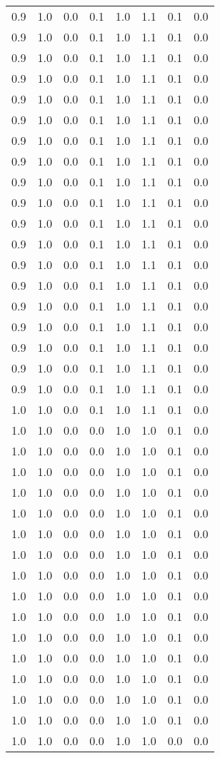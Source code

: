 \begin{tabular}{L{1in}|L{1in}|L{1in}|L{1in}|L{1in}|L{1in}|L{1in}|L{1in}}
0.9&1.0&0.0&0.1&1.0&1.1&0.1&0.0\\
0.9&1.0&0.0&0.1&1.0&1.1&0.1&0.0\\
0.9&1.0&0.0&0.1&1.0&1.1&0.1&0.0\\
0.9&1.0&0.0&0.1&1.0&1.1&0.1&0.0\\
0.9&1.0&0.0&0.1&1.0&1.1&0.1&0.0\\
0.9&1.0&0.0&0.1&1.0&1.1&0.1&0.0\\
0.9&1.0&0.0&0.1&1.0&1.1&0.1&0.0\\
0.9&1.0&0.0&0.1&1.0&1.1&0.1&0.0\\
0.9&1.0&0.0&0.1&1.0&1.1&0.1&0.0\\
0.9&1.0&0.0&0.1&1.0&1.1&0.1&0.0\\
0.9&1.0&0.0&0.1&1.0&1.1&0.1&0.0\\
0.9&1.0&0.0&0.1&1.0&1.1&0.1&0.0\\
0.9&1.0&0.0&0.1&1.0&1.1&0.1&0.0\\
0.9&1.0&0.0&0.1&1.0&1.1&0.1&0.0\\
0.9&1.0&0.0&0.1&1.0&1.1&0.1&0.0\\
0.9&1.0&0.0&0.1&1.0&1.1&0.1&0.0\\
0.9&1.0&0.0&0.1&1.0&1.1&0.1&0.0\\
0.9&1.0&0.0&0.1&1.0&1.1&0.1&0.0\\
0.9&1.0&0.0&0.1&1.0&1.1&0.1&0.0\\
1.0&1.0&0.0&0.1&1.0&1.1&0.1&0.0\\
1.0&1.0&0.0&0.0&1.0&1.0&0.1&0.0\\
1.0&1.0&0.0&0.0&1.0&1.0&0.1&0.0\\
1.0&1.0&0.0&0.0&1.0&1.0&0.1&0.0\\
1.0&1.0&0.0&0.0&1.0&1.0&0.1&0.0\\
1.0&1.0&0.0&0.0&1.0&1.0&0.1&0.0\\
1.0&1.0&0.0&0.0&1.0&1.0&0.1&0.0\\
1.0&1.0&0.0&0.0&1.0&1.0&0.1&0.0\\
1.0&1.0&0.0&0.0&1.0&1.0&0.1&0.0\\
1.0&1.0&0.0&0.0&1.0&1.0&0.1&0.0\\
1.0&1.0&0.0&0.0&1.0&1.0&0.1&0.0\\
1.0&1.0&0.0&0.0&1.0&1.0&0.1&0.0\\
1.0&1.0&0.0&0.0&1.0&1.0&0.1&0.0\\
1.0&1.0&0.0&0.0&1.0&1.0&0.1&0.0\\
1.0&1.0&0.0&0.0&1.0&1.0&0.1&0.0\\
1.0&1.0&0.0&0.0&1.0&1.0&0.1&0.0\\
1.0&1.0&0.0&0.0&1.0&1.0&0.0&0.0\\

\end{tabular}
